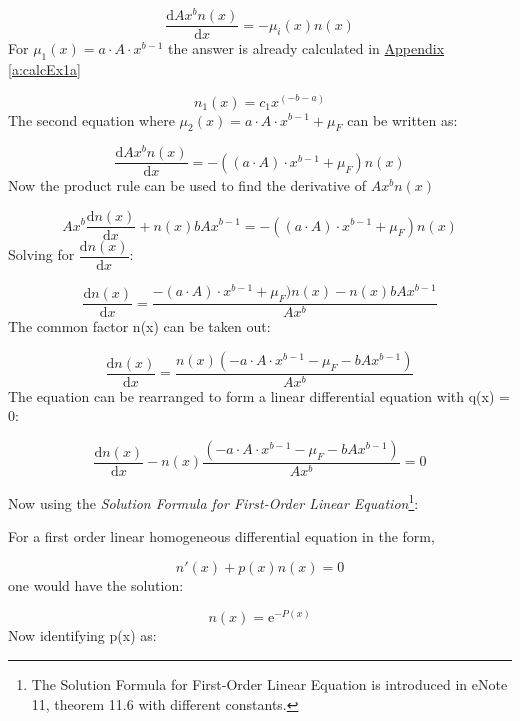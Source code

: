 \documentclass{article}
\numberwithin{equation}{section} %
\newcommand{\me}{\mathrm{e}}
\newcommand{\md}{\mathrm{d}}
\begin{document}
\begin{equation}
	\dfrac{\md Ax^{b}n(x)}{\md x} = -\mu_i(x)n(x)
\end{equation}
For $\mu_1(x)=a\cdot A\cdot x^{b-1}$ the answer is already calculated in \hyperref[a:calcEx1a]{Appendix \ref{a:calcEx1a}}

\begin{equation}
    n_1(x)=c_1x^(-b-a)
\end{equation}
The second equation where $\mu_2(x)=a\cdot A\cdot x^{b-1}+\mu_{F}$ can be written as:

\begin{equation}
	\dfrac{\md Ax^{b}n(x)}{\md x} = -((a\cdot A)\cdot x^{b-1}+\mu_{F})n(x)
\end{equation}
Now the product rule can be used to find the derivative of $Ax^bn(x)$

\begin{equation}
    Ax^b\dfrac{\md n(x)}{\md x} + n(x)bAx^{b-1} = -((a\cdot A)\cdot x^{b-1}+\mu_{F})n(x)
\end{equation}
Solving for $\dfrac{\md n(x)}{\md x}$:

\begin{equation}
    \dfrac{\md n(x)}{\md x} = \dfrac{-(a\cdot A)\cdot x^{b-1}+\mu_{F})n(x)-n(x)bAx^{b-1}}{Ax^b}
\end{equation}
The common factor n(x) can be taken out:

\begin{equation}
    \dfrac{\md n(x)}{\md x} = \dfrac{n(x)(-a\cdot A\cdot x^{b-1}-\mu_{F}-bAx^{b-1})}{Ax^b}
\end{equation}
The equation can be rearranged to form a linear differential equation with q(x) = 0:

\begin{equation}
    \dfrac{\md n(x)}{\md x}-n(x)\dfrac{(-a\cdot A\cdot x^{b-1}-\mu_{F}-bAx^{b-1})}{Ax^b}=0
\end{equation}

Now using the \textit{Solution Formula for First-Order Linear Equation}\footnote{The Solution Formula for First-Order Linear Equation is introduced in eNote 11, theorem 11.6 with different constants.}:

For a first order linear homogeneous differential equation in the form,

\begin{equation}
	n'(x)+p(x)n(x) = 0
\end{equation}
one would have the solution:

\begin{equation}\label{eq:difeqsol}
	n(x)=\me^{-P(x)}
\end{equation}
Now identifying p(x) as:
\end{document}
